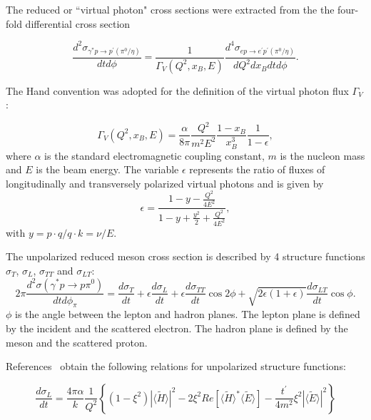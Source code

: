 \documentclass[prc,floatfix,superscriptaddress]{revtex4}
\newcommand{\GPDtE}{\langle \tilde{E} \rangle}
\newcommand{\GPDtH}{\langle \tilde{H} \rangle}
\begin{document}
The reduced or ``virtual photon"  cross sections  were extracted from the the four-fold differential cross section


\begin{equation}
\frac{d^2\sigma_{\gamma^* p \rightarrow p^\prime (\pi^0/\eta)} }{dt d\phi} = 
\frac{1}{\Gamma_V(Q^2,x_B,E)} 
\frac{d^4\sigma_{ep\rightarrow e^\prime p^\prime (\pi^0/\eta)}}{dQ^2 dx_B dt d\phi}.
\label{RXS}
\end{equation}

\noindent
The Hand convention  was adopted for the
definition of the virtual photon flux $\Gamma_V$: 

\begin{equation}
\Gamma_V (Q^2,x_B,E)= \frac{\alpha}{8\pi} \frac{Q^2}{m^2 E^2} 
\frac{1-x_B}{x_B^3} \frac{1}{1-\epsilon},
\label{eq:GammaV}
\end{equation}
\noindent where $\alpha$ is the standard electromagnetic coupling constant, $m$ is the nucleon mass and $E$ is the beam energy.
The variable $\epsilon$ represents the ratio of fluxes of longitudinally  and transversely polarized virtual photons and is given by
\begin{equation}
\epsilon=\frac {1-y-\frac{Q^2}{4E^2}}   {1-y+\frac{y^2}{2}+\frac{Q^2}{4E^2} }
\label{epsilon},
\end{equation}
with $y=p \cdot q/q \cdot k=\nu/E$.



The unpolarized reduced meson cross section is described 
 by 4 structure functions $\sigma_T$, $\sigma_L$, $\sigma_{TT}$ and $\sigma_{LT}$:
\begin{equation}
2\pi\frac{d^2\sigma(\gamma^*p\to p\pi^0)}{dtd\phi_\pi} = 
\frac{d\sigma_T}{dt} + 
\epsilon  \frac{d\sigma_L} {dt}+ 
\epsilon  \frac{d\sigma_{TT}} {dt}  \cos 2\phi+
\sqrt{2\epsilon (1+\epsilon)}   \frac{d\sigma_{LT}} {dt}  \cos \phi.
\label{Eq:Reduced}
\end{equation}
\noindent
$\phi$ is the angle between the lepton and hadron planes. The lepton plane
is defined by the incident and the scattered electron. The hadron plane
is defined by the meson and the scattered proton.

\noindent 
References~\cite{Goloskokov:2011rd,GL} obtain the following relations for unpolarized structure functions:

\begin{equation}
\label{SL}
\frac{d\sigma_{L} }{dt}= \frac{4\pi\alpha}{k}\frac{1}{Q^2}\left\{ \left( 1-\xi^2 \right) \left|\GPDtH\right|^2 -2\xi^2 {Re}\left[ \GPDtH^* \GPDtE \right] - \frac{t^\prime}{4m^2} \xi^2 \left| \GPDtE \right|^2 \right\}
\end{equation}
\end{document}
